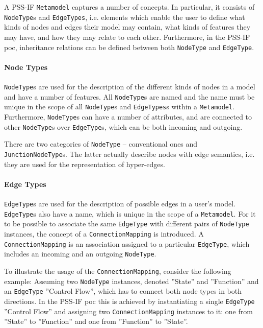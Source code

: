 A PSS-IF \texttt{Metamodel} captures a number of concepts. In particular, it consists of \texttt{NodeType}s and \texttt{EdgeTypes}, i.e. elements which enable the user to define what kinds of nodes and edges their model may contain, what kinds of features they may have, and how they may relate to each other. Furthermore, in the PSS-IF \gls{poc}, inheritance relations can be defined between both \texttt{NodeType} and \texttt{EdgeType}.

\paragraph{Node Types}

\texttt{NodeType}s are used for the description of the different kinds of nodes in a model and have a number of features. All \texttt{NodeType}s are named and the name must be unique in the scope of all \texttt{NodeType}s and \texttt{EdgeTypes}s within a \texttt{Metamodel}. Furthermore, \texttt{NodeType}s can have a number of attributes, and are connected to other \texttt{NodeType}s over \texttt{EdgeType}s, which can be both incoming and outgoing.

There are two categories of \texttt{NodeType} -- conventional ones and \texttt{JunctionNodeType}s. The latter actually describe nodes with edge semantics, i.e. they are used for the representation of hyper-edges.

\paragraph{Edge Types}

\texttt{EdgeType}s are used for the description of possible edges in a user's model. \texttt{EdgeType}s also have a name, which is unique in the scope of a \texttt{Metamodel}. For it to be possible to associate the same \texttt{EdgeType} with different pairs of \texttt{NodeType} instances, the concept of a \texttt{ConnectionMapping} is introduced. A \texttt{ConnectionMap\-ping} is an association assigned to a particular \texttt{EdgeType}, which includes an incoming and an outgoing \texttt{NodeType}.

To illustrate the usage of the \texttt{ConnectionMapping}, consider the following example: Assuming two \texttt{NodeType} instances, denoted ''State'' and ''Function'' and an \texttt{EdgeType} ''Control Flow'', which has to connect both node types in both directions. In the PSS-IF \gls{poc} this is achieved by instantiating a single \texttt{EdgeType} ''Control Flow'' and assigning two \texttt{ConnectionMapping} instances to it: one from ''State'' to ''Function'' and one from ''Function'' to ''State''.

